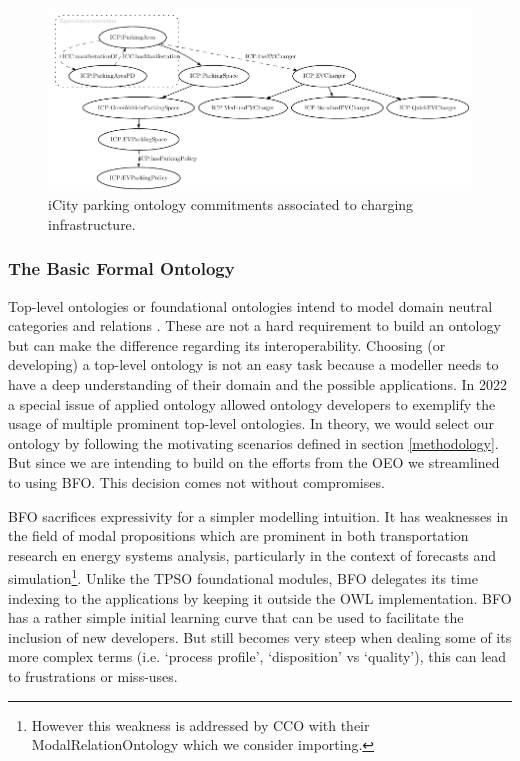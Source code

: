 \begin{figure}[h]
    \centering
    \includegraphics{images/PARKING.pdf}
    \caption{iCity parking ontology commitments associated to charging infrastructure.}
    \label{parkingfig}
\end{figure}

\subsubsection{The Basic Formal Ontology}
\label{upperlevel}

Top-level ontologies or foundational ontologies intend to model domain neutral
categories and relations \cite{Arp.2015}. These are not a hard requirement to
build an ontology but can make the difference regarding its interoperability.
Choosing (or developing) a top-level ontology is not an easy task because a
modeller needs to have a deep understanding of their domain and the possible
applications. In 2022 a special issue of applied ontology \cite{Borgo.2022}
allowed ontology developers to exemplify the usage of multiple prominent
top-level ontologies. In theory, we would select our ontology by following the
motivating scenarios defined in section \ref{methodology}. But since we are
intending to build on the efforts from the OEO we streamlined to using BFO.
This decision comes not without compromises. 

BFO sacrifices expressivity for a simpler modelling intuition. It has
weaknesses in the field of modal propositions which are prominent in both
transportation research en energy systems analysis, particularly in the context
of forecasts and simulation\footnote{However this weakness is addressed by CCO
with their ModalRelationOntology which we consider importing. }. Unlike the
TPSO foundational modules, BFO delegates its time indexing to the applications
by keeping it outside the OWL implementation. BFO has a rather simple initial
learning curve that can be used to facilitate the inclusion of new developers.
But still becomes very steep when dealing some of its more complex terms (i.e.
`process profile', `disposition' vs `quality'), this can lead to frustrations
or miss-uses.

